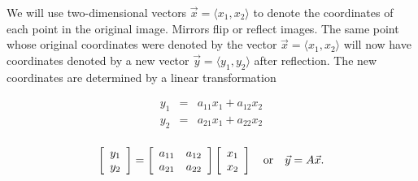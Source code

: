 \documentclass{ximera}
\begin{document}
We will use two-dimensional vectors $\vec x = \langle{x_1, x_2}\rangle$ to denote the coordinates of each point in the original image.  Mirrors flip or reflect images.  The same point whose original coordinates were denoted by the vector $\vec x = \langle{x_1, x_2}\rangle$ will now have coordinates denoted by a new vector $\vec y = \langle{y_1, y_2}\rangle$ after reflection.  
The new coordinates are determined by a linear transformation

\begin{eqnarray*}
y_1 &=& a_{11} x_1 + a_{12} x_2\\
y_2 &=& a_{21} x_1 + a_{22} x_2\\
\end{eqnarray*}

$$\left[{\begin{array}{c} y_1 \\ y_2 \\ \end{array}}\right] = \left[{\begin{array}{cc} a_{11} & a_{12} \\ a_{21} & a_{22} \\ \end{array}}\right] \left[{\begin{array}{c} x_1 \\ x_2 \\ \end{array}}\right]
\quad {\rm or} \quad \vec y = A \vec x.$$
\end{document}
